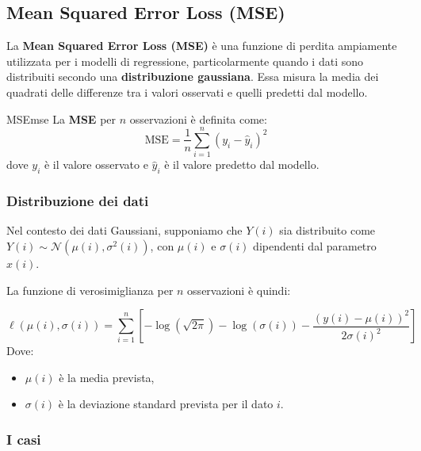 \subsection{Mean Squared Error Loss (MSE)}\label{subsec:mse}

La \textbf{Mean Squared Error Loss (MSE)} è una funzione di perdita ampiamente utilizzata per i modelli di regressione, particolarmente quando i dati sono distribuiti secondo una \textbf{distribuzione gaussiana}. Essa misura la media dei quadrati delle differenze tra i valori osservati e quelli predetti dal modello.

\begin{definizione}{MSE}{mse}
La \textbf{MSE} per \( n \) osservazioni è definita come:
\[
\mathrm{MSE} = \frac{1}{n} \sum_{i=1}^n \left( y_i - \hat{y}_i \right)^2
\]
dove \( y_i \) è il valore osservato e \( \hat{y}_i \) è il valore predetto dal modello.
\end{definizione}

\subsubsection*{Distribuzione dei dati}

Nel contesto dei dati Gaussiani, supponiamo che \( Y(i) \) sia distribuito come \( Y(i) \sim \mathcal{N}(\mu(i), \sigma^2(i)) \), con \( \mu(i) \) e \( \sigma(i) \) dipendenti dal parametro \( x(i) \).

La funzione di verosimiglianza per \( n \) osservazioni è quindi:

\[
\ell(\mu(i), \sigma(i)) = \sum_{i=1}^n \left[-\log(\sqrt{2\pi}) -\log(\sigma(i)) - \frac{(y(i) - \mu(i))^2}{2\sigma(i)^2} \right]
\]
Dove:
\begin{itemize}
    \item \( \mu(i) \) è la media prevista,
    \item \( \sigma(i) \) è la deviazione standard prevista per il dato \( i \).
\end{itemize}

\subsubsection{I casi}


